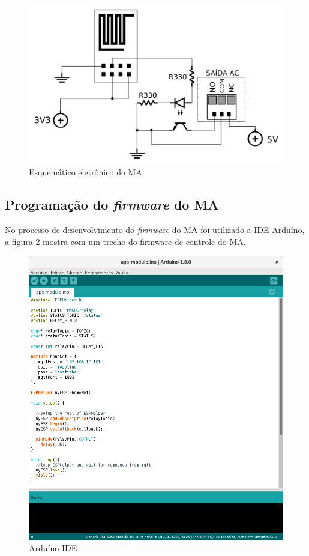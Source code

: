 \begin{figure}[H]
\caption{\label{sch-ma} Esquemático eletrônico do MA}
\includegraphics[scale=0.25]{img/sch-ma.png}
\end{figure}

\subsection{Programação do \textit{firmware} do MA}
No processo de desenvolvimento do \textit{firmware} do MA foi utilizado a IDE Arduíno, a figura \ref{arduino-ide} mostra com um trecho do firmware de controle do MA.

\begin{figure}[H]
\caption{\label{arduino-ide} Arduíno IDE}
\includegraphics[scale=0.3]{img/ide-arduino.png}
\end{figure}

